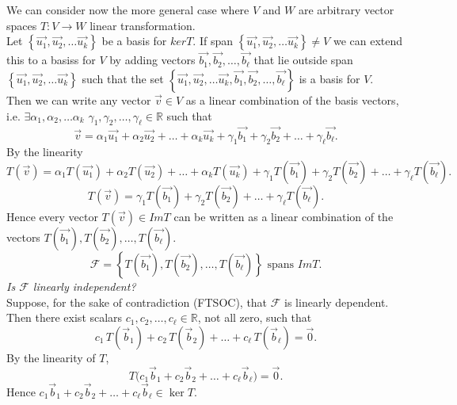 \documentclass{report}
\begin{document}
 We can consider now the more general case where $ V$ and $ W$ are arbitrary vector spaces $ T: V \to W$ linear transformation.\\
 Let $ \left\{ \vec{ u_1} , \vec{ u_2} , \ldots \vec{ u_k}  \right\}$ be a basis for $ ker T$. If span $ \left\{ \vec{ u_1} , \vec{ u_2} , \ldots \vec{ u_k}  \right\} \neq V $ we can extend this to a basiss for $ V$ by adding vectors $ \vec{ b_1} , \vec{ b_2} , \ldots , \vec{ b_{\ell}}$ that lie outside span $ \left\{ \vec{ u_1} , \vec{ u_2} , \ldots \vec{ u_k}  \right\}$ such  that the set $ \left\{ \vec{ u_1} , \vec{ u_2} , \ldots \vec{ u_k} , \vec{ b_1} , \vec{ b_2} , \ldots , \vec{ b_{\ell}}  \right\}$ is a basis for $ V$.\\
 Then we can write any vector $ \vec{ v}  \in V$ as a linear combination of the basis vectors, i.e. $ \exists  \alpha _1, \alpha_2 , \ldots \alpha_k$ $ \gamma_1, \gamma_2, \ldots ,\gamma_{\ell} \in \mathbb{R}$ such that
 \[
 \vec{ v} = \alpha_1 \vec{ u_1} + \alpha_2 \vec{ u_2} + \ldots + \alpha_k \vec{ u_k} + \gamma_1 \vec{ b_1} + \gamma_2 \vec{ b_2} + \ldots + \gamma_{\ell} \vec{ b_{\ell}}
 .\] 
 By the linearity 
 \[
 T \left(  \vec{ v}  \right) = \alpha_1 T \left( \vec{ u_1}  \right) + \alpha_2 T \left( \vec{ u_2}  \right) + \ldots + \alpha_k T \left( \vec{ u_k}  \right) + \gamma_1 T \left( \vec{ b_1}  \right) + \gamma_2 T \left( \vec{ b_2}  \right) + \ldots + \gamma_{\ell} T \left( \vec{ b_{\ell}}  \right)
 .\] 
  \[
  T \left( \vec{ v}  \right) = \gamma_1 T \left( \vec{ b_1}  \right) + \gamma_2 T \left( \vec{ b_2}  \right) + \ldots + \gamma_{\ell} T \left( \vec{ b_{\ell}}  \right)
  .\] 
  Hence every vector $ T \left( \vec{ v}  \right) \in Im T$ can be written as a linear combination of the vectors $ T \left( \vec{ b_1}  \right) , T \left( \vec{ b_2}  \right) , \ldots , T \left( \vec{ b_{\ell}}  \right)$.\\
  \[
  \mathcal{F} = \left\{ T \left( \vec{ b_1}  \right) , T \left( \vec{ b_2}  \right) , \ldots , T \left( \vec{ b_{\ell}}  \right)  \right\} \text{ spans } Im T
  .\] 
\textit{Is \(\mathcal{F}\) linearly independent?}\\
Suppose, for the sake of contradiction (FTSOC), that \(\mathcal{F}\) is linearly dependent.  
Then there exist scalars \(c_1,c_2,\ldots,c_{\ell}\in\mathbb{R}\), not all zero, such that
\[
  c_1\,T(\vec b_1)+c_2\,T(\vec b_2)+\dots+c_{\ell}\,T(\vec b_{\ell})=\vec 0 .
\]
By the linearity of \(T\),
\[
  T\!\bigl(c_1\vec b_1+c_2\vec b_2+\dots+c_{\ell}\vec b_{\ell}\bigr)=\vec 0 .
\]
Hence \(c_1\vec b_1+c_2\vec b_2+\dots+c_{\ell}\vec b_{\ell}\in\ker T\).\\[6pt]
\end{document}
